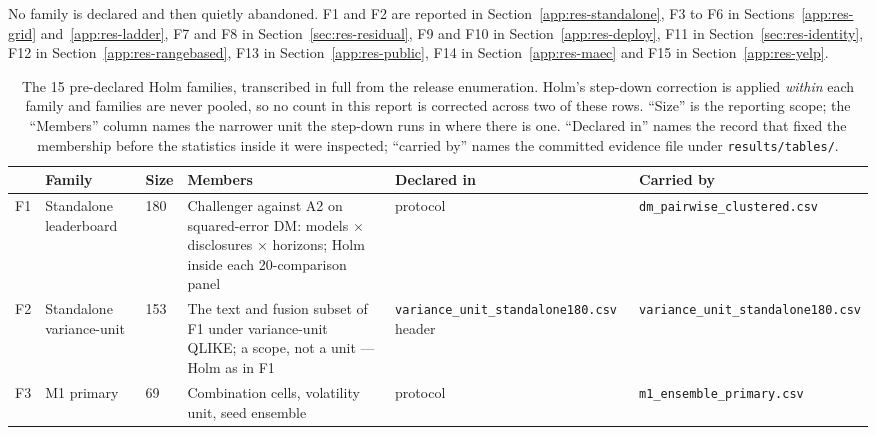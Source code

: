 No family is declared and then quietly abandoned. F1 and F2 are reported
in Section~\ref{app:res-standalone}, F3 to F6 in
Sections~\ref{app:res-grid} and~\ref{app:res-ladder}, F7 and F8 in
Section~\ref{sec:res-residual}, F9 and F10 in
Section~\ref{app:res-deploy}, F11 in Section~\ref{sec:res-identity}, F12
in Section~\ref{app:res-rangebased}, F13 in
Section~\ref{app:res-public}, F14 in Section~\ref{app:res-maec} and F15
in Section~\ref{app:res-yelp}.

\begin{table}[htbp]
\centering
\caption[The 15 pre-declared Holm families]{The 15 pre-declared Holm
families, transcribed in full from the release enumeration. Holm's
step-down correction \cite{holm1979simple} is applied \emph{within} each
family and families are never pooled, so no count in this report is
corrected across two of these rows. ``Size'' is the reporting scope; the
``Members'' column names the narrower unit the step-down runs in where
there is one. ``Declared in'' names the record that
fixed the membership before the statistics inside it were inspected;
``carried by'' names the committed evidence file under
\texttt{results/tables/}.}
\label{tab:app-holm-families}
\singlespacing\footnotesize
\setlength{\tabcolsep}{3pt}
\begin{tabular}{@{}l>{\raggedright\arraybackslash}p{}l>{\raggedright\arraybackslash}p{}>{\raggedright\arraybackslash}p{}>{\raggedright\arraybackslash}p{}@{}}
\toprule
& Family & Size & Members & Declared in & Carried by \\
\midrule
F1 & Standalone leaderboard & 180 & Challenger against A2 on squared-error DM: models $\times$ disclosures $\times$ horizons; Holm inside each 20-comparison panel & protocol & \texttt{dm\_\allowbreak pairwise\_\allowbreak clustered.csv} \\
F2 & Standalone variance-unit & 153 & The text and fusion subset of F1 under variance-unit QLIKE; a scope, not a unit --- Holm as in F1 & \texttt{variance\_\allowbreak unit\_\allowbreak standalone180.\allowbreak csv} header & \texttt{variance\_\allowbreak unit\_\allowbreak standalone180.\allowbreak csv} \\ %
\addlinespace
F3 & M1 primary & 69 & Combination cells, volatility unit, seed ensemble & protocol & \texttt{m1\_\allowbreak ensemble\_\allowbreak primary.csv} \\

\end{tabular}
\end{table}
